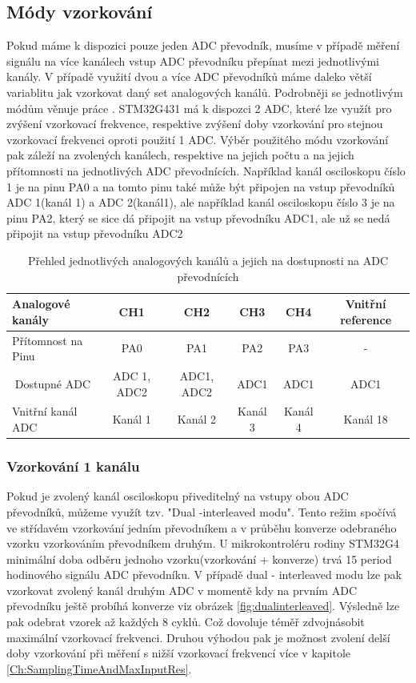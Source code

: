\subsection{Módy vzorkování}
Pokud máme k dispozici pouze jeden ADC převodník, musíme v případě měření signálu na více kanálech vstup ADC převodníku přepínat mezi jednotlivými kanály. V případě využití dvou a více ADC převodníků máme daleko větší variablitu jak vzorkovat daný set analogových kanálů. Podrobněji se jednotlivým módům věnuje práce \cite{DujavaDIP}. STM32G431 má k dispozci 
2 ADC, které lze využít pro zvýšení vzorkovací frekvence, respektive zvýšení doby vzorkování pro stejnou vzorkovací frekvenci oproti použití 1 ADC. Výběr použitého módu vzorkování pak záleží na zvolených kanálech, respektive na jejich počtu a na jejich přítomnosti na jednotlivých ADC převodnících. Například kanál osciloskopu číslo 1 je na pinu PA0 a na tomto pinu také může být připojen na vstup převodníků ADC 1(kanál 1) a ADC 2(kanál1), ale například kanál osciloskopu číslo 3 je na pinu PA2, který se sice dá připojit na vstup převodníku ADC1, ale už se nedá připojit na vstup převodníku ADC2
\begin{table}[]
	\begin{tabular}{lccccc}
		Analogové kanály                & CH1         & CH2        & CH3     & CH4     & Vnitřní reference \\ \hline
		Přítomnost na Pinu               & PA0         & PA1        & PA2     & PA3     & -                 \\ \hline
		\multicolumn{1}{c}{Dostupné ADC} & ADC 1, ADC2 & ADC1, ADC2 & ADC1    & ADC1    & ADC1              \\ \hline
		Vnitřní kanál ADC                & Kanál 1     & Kanál 2    & Kanál 3 & Kanál 4 & Kanál 18         
	\end{tabular}
	\caption{Přehled jednotlivých analogových kanálů a jejich na dostupnosti na ADC převodnících}
	\label{tab:kanalyADC}
\end{table}

\subsubsection{Vzorkování 1 kanálu}
Pokud je zvolený kanál osciloskopu  přiveditelný na vstupy obou ADC převodníků, můžeme využít tzv. "Dual -interleaved modu". Tento režim spočívá ve střídavém vzorkování jedním převodníkem a v průběhu konverze odebraného vzorku vzorkováním převodníkem druhým. U mikrokontroléru rodiny STM32G4 minimální doba odběru jednoho vzorku(vzorkování + konverze) trvá 15 period hodinového signálu ADC převodníku. V případě dual - interleaved modu lze pak vzorkovat zvolený kanál druhým ADC v momentě kdy na prvním ADC převodníku ještě probíhá konverze viz obrázek \ref{fig:dualinterleaved}. Výsledně lze pak odebrat vzorek až každých 8 cyklů. Což dovoluje téměř zdvojnásobit maximální vzorkovací frekvenci. Druhou výhodou pak je možnost zvolení delší doby vzorkování při měření s nižší vzorkovací frekvencí více v kapitole \ref{Ch:SamplingTimeAndMaxInputRes}. \\

